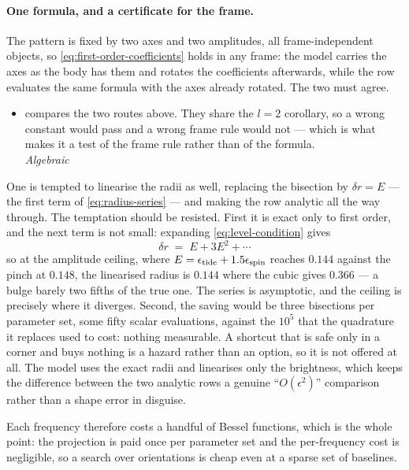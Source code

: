 \paragraph{One formula, and a certificate for the frame.}  The pattern is fixed by two axes and
two amplitudes, all frame-independent objects, so \eqref{eq:first-order-coefficients} holds in
any frame: the model carries the axes as the body has them and rotates the coefficients
afterwards, while the row evaluates the same formula with the axes already rotated.  The two
must agree.

\begin{itemize}
  \item[$\checkmark$]  compares the two routes above.  They share the
    $l = 2$ corollary, so a wrong constant would pass and a wrong frame rule would not --- which is
    what makes it a test of the frame rule rather than of the formula.
    \\[1pt] \quad \emph{Algebraic}
\end{itemize}

One is tempted to linearise the radii as well, replacing the bisection by $\delta r = E$ --- the
first term of \eqref{eq:radius-series} --- and making the row analytic all the way through.  The temptation should be resisted.  First it
is exact only to first order, and the next term is not small: expanding
\eqref{eq:level-condition} gives
\begin{equation}
  \delta r \;=\; E + 3E^2 + \cdots
  \label{eq:radius-series}
\end{equation}
so at the amplitude ceiling, where $E = \epsilon_\text{tide} + 1.5\epsilon_\text{spin}$ reaches
$0.144$ against the pinch at $0.148$, the linearised radius is $0.144$ where the cubic gives
$0.366$ --- a bulge barely two fifths of the true one.  The series is asymptotic, and the
ceiling is precisely where it diverges.  Second, the saving would be three bisections per
parameter set, some fifty scalar evaluations, against the $10^5$ that the quadrature it
replaces used to cost: nothing measurable.  A shortcut that is safe only in a corner and buys
nothing is a hazard rather than an option, so it is not offered at all.  The model uses the
exact radii and linearises only the brightness, which keeps the difference between the two
analytic rows a genuine ``$O(\epsilon^2)$'' comparison rather than a shape error in disguise.

Each frequency therefore costs a
handful of Bessel functions, which is the whole point: the projection is paid once per
parameter set and the per-frequency cost is negligible, so a search over orientations is
cheap even at a sparse set of baselines.

